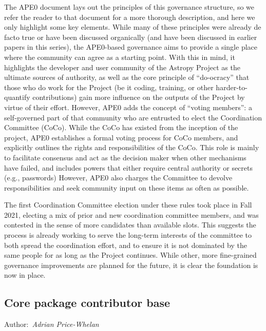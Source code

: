 \documentclass[modern]{aastex631}
\newcommand{\secauthor}[1]{{\color{blue}Author:~\textit{#1}}}
\begin{document}
The APE0 \citep{ape0} document lays out the principles of this governance
structure, so we refer the reader to that document for a more thorough
description, and here we only highlight some key elements. While many of these
principles were already de facto true or have been discussed organically (and
have been discussed in earlier papers in this series), the APE0-based governance
aims to provide a single place where the community can agree as a starting
point. With this in mind, it highlights the developer and user community of the
Astropy Project as the ultimate sources of authority, as well as the core
principle of ``do-ocracy'' that those who do work for the Project (be it coding,
training, or other harder-to-quantify contributions) gain more influence on the
outputs of the Project by virtue of their effort. However, APE0 adds the
concept of ``voting members'': a self-governed part of that community who are
entrusted to elect the Coordination Committee (CoCo). While the CoCo has existed
from the inception of the project, APE0 establishes a formal voting process for
CoCo members, and explicitly outlines the rights and responsibilities of the
CoCo. This role is mainly to facilitate consensus and act as the decision maker
when other mechanisms have failed, and includes powers that either
require central authority or secrets (e.g., passwords) However, APE0 also
charges the Committee to devolve responsibilities and seek community input on
these items as often as possible.

The first Coordination Committee election under these rules took place in Fall
2021, electing a mix of prior and new coordination committee members,
and was contested in the sense of more candidates than available slots. This
suggests the process is already working to serve the long-term interests of the
committee to both spread the coordination effort, and to ensure it is not
dominated by the same people for as long as the Project continues. While other,
more fine-grained governance improvements are planned for the future, it is
clear the foundation is now in place.


\subsection{Core package contributor base} \label{sec:project-contributors}

\secauthor{Adrian Price-Whelan}

\end{document}
